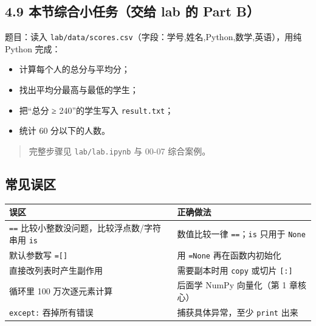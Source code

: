 \subsection{4.9 本节综合小任务（交给 lab 的 Part
B）}\label{ux672cux8282ux7efcux5408ux5c0fux4efbux52a1ux4ea4ux7ed9-lab-ux7684-part-b}

题目：读入
\texttt{lab/data/scores.csv}（字段：学号,姓名,Python,数学,英语），用纯
Python 完成：

\begin{itemize}
\tightlist
\item
  计算每个人的总分与平均分；
\item
  找出平均分最高与最低的学生；
\item
  把``总分 ≥ 240''的学生写入 \texttt{result.txt}；
\item
  统计 60 分以下的人数。
\end{itemize}

\begin{quote}
完整步骤见 \texttt{lab/lab.ipynb} 与 00-07 综合案例。
\end{quote}

\subsection{常见误区}\label{ux5e38ux89c1ux8befux533a}

{\def\LTcaptype{none} %
\begin{longtable}[]{@{}
  >{\raggedright\arraybackslash}p{}
  >{\raggedright\arraybackslash}p{}@{}}
\toprule\noalign{}
\begin{minipage}[b]{\linewidth}\raggedright
误区
\end{minipage} & \begin{minipage}[b]{\linewidth}\raggedright
正确做法
\end{minipage} \\
\midrule\noalign{}
\endhead
\bottomrule\noalign{}
\endlastfoot
\texttt{==} 比较小整数没问题，比较浮点数/字符串用 \texttt{is} &
数值比较一律 \texttt{==}；\texttt{is} 只用于 \texttt{None} \\
默认参数写 \texttt{={[}{]}} & 用 \texttt{=None} 再在函数内初始化 \\
直接改列表时产生副作用 & 需要副本时用 \texttt{copy} 或切片
\texttt{{[}:{]}} \\
循环里 100 万次逐元素计算 & 后面学 NumPy 向量化（第 1 章核心） \\
\texttt{except:} 吞掉所有错误 & 捕获具体异常，至少 \texttt{print}
出来 \\
\end{longtable}
}

